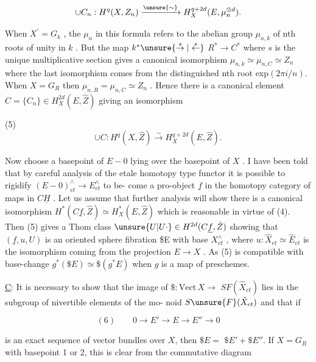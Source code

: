 

\margin{\handwritten{$\checkmark$}}\[ \cup C_n : H^q(X, Z_n) \xrightarrow{\unsure{\sim}} H^{q+2d}_X (E, \mu_n^{\otimes d}) . \]

When $X^\prime = G_k$ , the $\mu_n$ in this formula refers to the abelian
group $\mu_{n,k}$ of nth roots of unity in $k$ . But the map $k^* \unsure{\overset{s}{\rightarrow}|\overset{s}{\leftarrow}}$
$R^* \to C^*$ where $s$ is the unique multiplicative section gives a
canonical isomorphism $\mu_{n,k} \simeq \mu_{n,C} \simeq Z_n$ where the last isomorphism
comes from the distinguished nth root exp$(2\pi i/n)$. When $X = G_R$
then $\mu_{n,R} = \mu_{n,C} \simeq Z_n$ . Hence there is a canonical element
$C = \{C_n\} \in H^{2d}_X(E, \hat{Z})$ giving an isomorphism

(5) \[ \cup C : H^q(X, \hat{Z}) \xrightarrow{\sim} H^{q+2d}_X(E, \hat{Z}) . \]

Now choose a basepoint of $E - 0$ lying over the basepoint of $X$ .
I have been told that by careful analysis of the etale homotopy
type functor it is possible to rigidify $(E - 0)^\wedge_{et} \to E^\wedge_{et}$ to be-%
come a pro-object $\underline{f}$ in the homotopy category of maps in $C\underline{H}$ .
Let us assume that further analysis will show there is a canonical
isomorphism $H^*(C\underline{f}, \hat{Z}) \simeq H^*_X(E, \hat{Z})$ which is reasonable in virtue of
(4). Then (5) gives a Thom class $\unsure{U|U\cdot} \in H^{2d}(C\underline{f}, \hat{Z})$ showing that
$(\underline{f},u,U)$ is an oriented sphere fibration \$E with base $X^\wedge_{et}$ ,
where $u : \hat{X}_{et} \simeq \hat{E}_{et}$ is the isomorphism coming from the projection
$E \to X$ . As (5) is compatible with base-change $g^*(\$E) \simeq \$(g^*E)$
when $g$ is a map of preschemes.



\uline{C}: It is necessary to show that the image of $\$:\mathrm{Vect}\,X \rightarrow$
$SF(\hat{X}_{et})$ lies in the subgroup of nivertible elements of the mo-%
noid $S\unsure{F}(\hat{X}_{et})$ and that if

\[
(6) \qquad 0 \rightarrow E' \rightarrow E \rightarrow E'' \rightarrow 0
\]

is an exact sequence of vector bundles over $X$, then $\$E =$
$\$E' + \$E''$. If $X = G_R$ with basepoint 1 or 2, this is clear from
the commutative diagram

